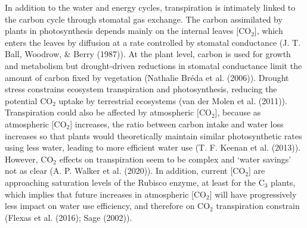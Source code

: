 \documentclass[11pt,twoside]{reedthesis}
\begin{document}
In addition to the water and energy cycles, transpiration is intimately
linked to the carbon cycle through stomatal gas exchange. The carbon
assimilated by plants in photosynthesis depends mainly on the internal
leaves {[}\(\text{CO}_2\){]}, which enters the leaves by diffusion at a
rate controlled by stomatal conductance (J. T. Ball, Woodrow, \& Berry
(1987)). At the plant level, carbon is used for growth and metabolism
but drought-driven reductions in stomatal conductance limit the amount
of carbon fixed by vegetation (Nathalie Bréda et al. (2006)). Drought
stress constrains ecosystem transpiration and photosynthesis, reducing
the potential \(\text{CO}_2\) uptake by terrestrial ecosystems (van der
Molen et al. (2011)). Transpiration could also be affected by
atmospheric {[}\(\text{CO}_2\){]}, because as atmospheric
{[}\(\text{CO}_2\){]} increases, the ratio between carbon intake and
water loss increases so that plants would theoretically maintain similar
photosynthetic rates using less water, leading to more efficient water
use (T. F. Keenan et al. (2013)). However, \(\text{CO}_2\) effects on
transpiration seem to be complex and `water savings' not as clear (A. P.
Walker et al. (2020)). In addition, current {[}\(\text{CO}_2\){]} are
approaching saturation levels of the Rubisco enzyme, at least for the
\(\text{C}_3\) plants, which implies that future increases in
atmospheric {[}\(\text{CO}_2\){]} will have progressively less impact on
water use efficiency, and therefore on \(\text{CO}_2\) transpiration
constrain (Flexas et al. (2016); Sage (2002)).\par
\end{document}
